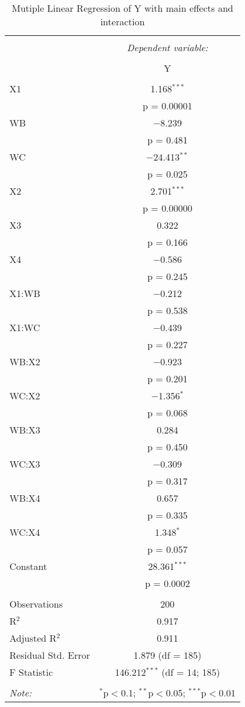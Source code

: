 
\begin{table}[!htbp] \centering 
  \caption{Mutiple Linear Regression of Y with main effects and interaction} 
  \label{tab::multi_full_1} 
\begin{tabular}{@{\extracolsep{5pt}}lc} 
\\[-1.8ex]\hline 
\hline \\[-1.8ex] 
 & \multicolumn{1}{c}{\textit{Dependent variable:}} \\ 
\cline{2-2} 
\\[-1.8ex] & Y \\ 
\hline \\[-1.8ex] 
 X1 & 1.168$^{***}$ \\ 
  & p = 0.00001 \\ 
  WB & $-$8.239 \\ 
  & p = 0.481 \\ 
  WC & $-$24.413$^{**}$ \\ 
  & p = 0.025 \\ 
  X2 & 2.701$^{***}$ \\ 
  & p = 0.00000 \\ 
  X3 & 0.322 \\ 
  & p = 0.166 \\ 
  X4 & $-$0.586 \\ 
  & p = 0.245 \\ 
  X1:WB & $-$0.212 \\ 
  & p = 0.538 \\ 
  X1:WC & $-$0.439 \\ 
  & p = 0.227 \\ 
  WB:X2 & $-$0.923 \\ 
  & p = 0.201 \\ 
  WC:X2 & $-$1.356$^{*}$ \\ 
  & p = 0.068 \\ 
  WB:X3 & 0.284 \\ 
  & p = 0.450 \\ 
  WC:X3 & $-$0.309 \\ 
  & p = 0.317 \\ 
  WB:X4 & 0.657 \\ 
  & p = 0.335 \\ 
  WC:X4 & 1.348$^{*}$ \\ 
  & p = 0.057 \\ 
  Constant & 28.361$^{***}$ \\ 
  & p = 0.0002 \\ 
 \hline \\[-1.8ex] 
Observations & 200 \\ 
R$^{2}$ & 0.917 \\ 
Adjusted R$^{2}$ & 0.911 \\ 
Residual Std. Error & 1.879 (df = 185) \\ 
F Statistic & 146.212$^{***}$ (df = 14; 185) \\ 
\hline 
\hline \\[-1.8ex] 
\textit{Note:}  & \multicolumn{1}{r}{$^{*}$p$<$0.1; $^{**}$p$<$0.05; $^{***}$p$<$0.01} \\ 
\end{tabular} 
\end{table} 
